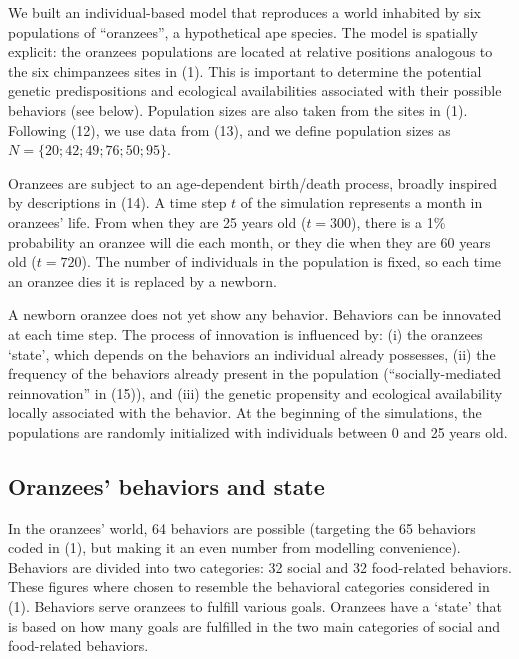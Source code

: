 \documentclass[9pt,twocolumn,twoside,]{pnas-new}
\begin{document}
We built an individual-based model that reproduces a world inhabited by
six populations of ``oranzees'', a hypothetical ape species. The model
is spatially explicit: the oranzees populations are located at relative
positions analogous to the six chimpanzees sites in (1). This is
important to determine the potential genetic predispositions and
ecological availabilities associated with their possible behaviors (see
below). Population sizes are also taken from the sites in (1). Following
(12), we use data from (13), and we define population sizes as
\(N=\{20;42;49;76;50;95\}\).

Oranzees are subject to an age-dependent birth/death process, broadly
inspired by descriptions in (14). A time step \(t\) of the simulation
represents a month in oranzees' life. From when they are 25 years old
(\(t=300\)), there is a 1\% probability an oranzee will die each month,
or they die when they are 60 years old (\(t=720\)). The number of
individuals in the population is fixed, so each time an oranzee dies it
is replaced by a newborn.

A newborn oranzee does not yet show any behavior. Behaviors can be
innovated at each time step. The process of innovation is influenced by:
(i) the oranzees `state', which depends on the behaviors an individual
already possesses, (ii) the frequency of the behaviors already present
in the population (``socially-mediated reinnovation'' in (15)), and
(iii) the genetic propensity and ecological availability locally
associated with the behavior. At the beginning of the simulations, the
populations are randomly initialized with individuals between 0 and 25
years old.

\subsection*{Oranzees' behaviors and state}\label{format}

In the oranzees' world, 64 behaviors are possible (targeting the 65
behaviors coded in (1), but making it an even number from modelling
convenience). Behaviors are divided into two categories: 32 social and
32 food-related behaviors. These figures where chosen to resemble the
behavioral categories considered in (1). Behaviors serve oranzees to
fulfill various goals. Oranzees have a `state' that is based on how many
goals are fulfilled in the two main categories of social and
food-related behaviors.
\end{document}

